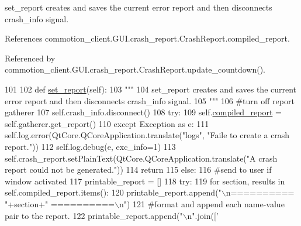 \begin{DoxyVerb}set_report creates and saves the current error report and then disconnects crash_info signal.
\end{DoxyVerb}
 

References commotion\+\_\+client.\+G\+U\+I.\+crash\+\_\+report.\+Crash\+Report.\+compiled\+\_\+report.



Referenced by commotion\+\_\+client.\+G\+U\+I.\+crash\+\_\+report.\+Crash\+Report.\+update\+\_\+countdown().


\begin{DoxyCode}
101 
102     \textcolor{keyword}{def }\hyperlink{classcommotion__client_1_1GUI_1_1crash__report_1_1CrashReport_ade1514cafdc6eabee38a3f4cc2468411}{set\_report}(self):
103         \textcolor{stringliteral}{"""}
104 \textcolor{stringliteral}{        set\_report creates and saves the current error report and then disconnects crash\_info signal.}
105 \textcolor{stringliteral}{        """}
106         \textcolor{comment}{#turn off report gatherer}
107         self.crash\_info.disconnect()
108         \textcolor{keywordflow}{try}:
109             self.\hyperlink{classcommotion__client_1_1GUI_1_1crash__report_1_1CrashReport_ae827ad1a3c91a32bb0a588b18d8a6ff2}{compiled\_report} = self.gatherer.get\_report()
110         \textcolor{keywordflow}{except} Exception \textcolor{keyword}{as} e:
111             self.log.error(QtCore.QCoreApplication.translate(\textcolor{stringliteral}{"logs"}, \textcolor{stringliteral}{"Faile to create a crash report."}))
112             self.log.debug(e, exc\_info=1)
113             self.crash\_report.setPlainText(QtCore.QCoreApplication.translate(\textcolor{stringliteral}{"A crash report could not be
       generated."}))
114             \textcolor{keywordflow}{return}
115         \textcolor{keywordflow}{else}:
116             \textcolor{comment}{#send to user if window activated}
117             printable\_report = []
118             \textcolor{keywordflow}{try}:
119                 \textcolor{keywordflow}{for} section, results \textcolor{keywordflow}{in} self.compiled\_report.items():
120                     printable\_report.append(\textcolor{stringliteral}{"\(\backslash\)n==========  "}+section+\textcolor{stringliteral}{"  ==========\(\backslash\)n"})
121                     \textcolor{comment}{#format and append each name-value pair to the report.}
122                     printable\_report.append(\textcolor{stringliteral}{"\(\backslash\)n"}.join([\textcolor{stringliteral}{'%
}
\end{DoxyCode}
